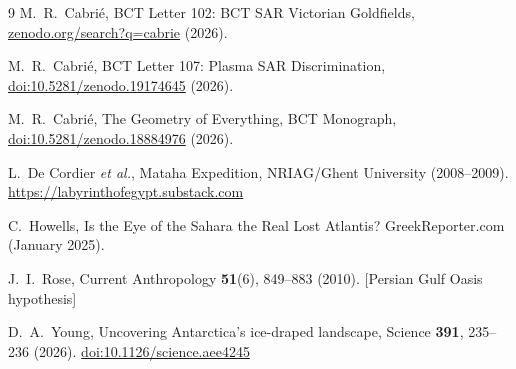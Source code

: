 \documentclass[12pt,twocolumn]{article}
\begin{document}
\begin{thebibliography}{9}
 M.~R.~Cabri\'{e},
BCT Letter 102: BCT SAR Victorian Goldfields,
\href{https://zenodo.org/search?q=cabrie}
{zenodo.org/search?q=cabrie} (2026).

 M.~R.~Cabri\'{e},
BCT Letter 107: Plasma SAR Discrimination,
\href{https://doi.org/10.5281/zenodo.19174645}
{doi:10.5281/zenodo.19174645} (2026).

 M.~R.~Cabri\'{e},
The Geometry of Everything, BCT Monograph,
\href{https://doi.org/10.5281/zenodo.18884976}
{doi:10.5281/zenodo.18884976} (2026).

 L.~De Cordier \textit{et al.},
Mataha Expedition, NRIAG/Ghent University (2008--2009).
\url{https://labyrinthofegypt.substack.com}

 C.~Howells,
Is the Eye of the Sahara the Real Lost Atlantis?
GreekReporter.com (January 2025).

 J.~I.~Rose,
Current Anthropology \textbf{51}(6), 849--883 (2010).
[Persian Gulf Oasis hypothesis]

 D.~A.~Young,
Uncovering Antarctica's ice-draped landscape,
Science \textbf{391}, 235--236 (2026).
\href{https://doi.org/10.1126/science.aee4245}
{doi:10.1126/science.aee4245}
\end{thebibliography}
\end{document}
